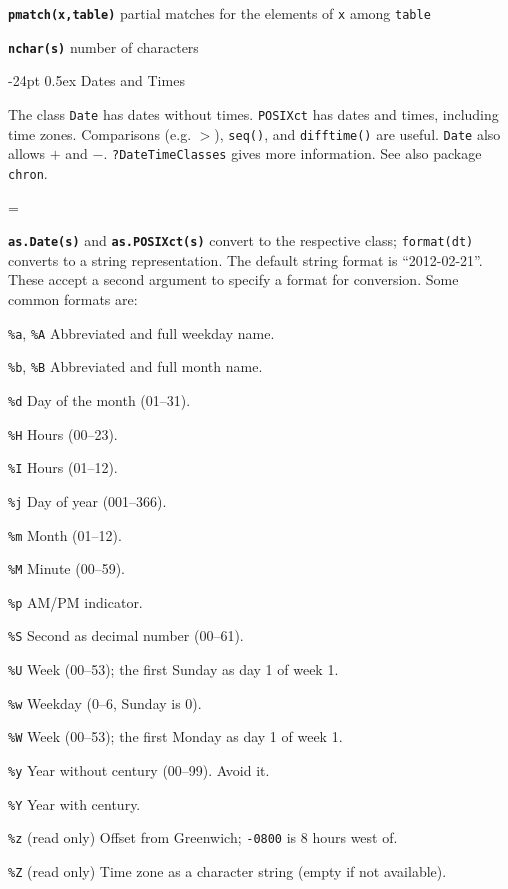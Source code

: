 \documentclass[8pt,landscape]{article}
\makeatletter
\renewcommand\section{\@startsection{section}{1}{0mm}%
                                     {-24pt}%
                                     {0.5ex}%
                                {\color{blue}\normalfont\large\bfseries}}
\newcommand{\code}{\texttt}
\newcommand{\bcode}[1]{\texttt{\textbf{#1}}}
\newcommand{\describe}[1]{\begin{description}{#1}\end{description}}
\makeatother
\begin{document}
\begin{multicols*}{3}
\bcode{pmatch(x,table)} partial matches for the elements of \code{x} among \code{table}

\bcode{nchar(s)} number of characters


\section{\color{blue}Dates and Times}

The class \code{Date} has dates without times.  \code{POSIXct} has
dates and times, including time zones. Comparisons (e.g. $>$),
\code{seq()}, and \code{difftime()} are useful. \code{Date} also allows
$+$ and $-$. \code{?DateTimeClasses} gives more information. See also package
\code{chron}.

\everypar={\hangindent=9mm}

\bcode{as.Date(s)} and \bcode{as.POSIXct(s)} convert to the respective
class; \code{format(dt)} converts to a string representation. The
default string format is ``2012-02-21''. These accept a second argument
to specify a format for conversion. Some common formats are:

  \describe{
\itemsep=0pt\parskip=0pt
    \item{\code{\%a}, \code{\%A}} {Abbreviated and full weekday name.}
    \item{\code{\%b}, \code{\%B}} {Abbreviated and full month name.}
    \item{\code{\%d}} {Day of the month (01--31).}
    \item{\code{\%H}} {Hours (00--23).}
    \item{\code{\%I}} {Hours (01--12).}
    \item{\code{\%j}} {Day of year (001--366).}
    \item{\code{\%m}} {Month (01--12).}
    \item{\code{\%M}} {Minute (00--59).}
    \item{\code{\%p}} {AM/PM indicator. }
    \item{\code{\%S}} {Second as decimal number (00--61).}
    \item{\code{\%U}} {Week (00--53); the first Sunday as day 1 of week 1.}
    \item{\code{\%w}} {Weekday (0--6, Sunday is 0).}
    \item{\code{\%W}} {Week (00--53); the first Monday as day 1 of week 1.}
    \item{\code{\%y}} {Year without century (00--99). Avoid it.}
    \item{\code{\%Y}} {Year with century.}
    \item{\code{\%z}} {(read only) Offset from Greenwich; \code{-0800} 
        is 8 hours west of.}
    \item{\code{\%Z}} {(read only) Time zone as a character string 
        (empty if not available).}
  }


\end{multicols*}
\end{document}
